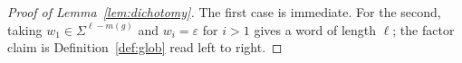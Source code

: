 \begin{proof}[Proof of Lemma~\ref{lem:dichotomy}]
The first case is immediate. For the second, taking $w_1\in\Sigma^{\ell-m(g)}$ and
$w_i=\varepsilon$ for $i>1$ gives a word of length $\ell$; the factor claim is
Definition~\ref{def:glob} read left to right.
\end{proof}
